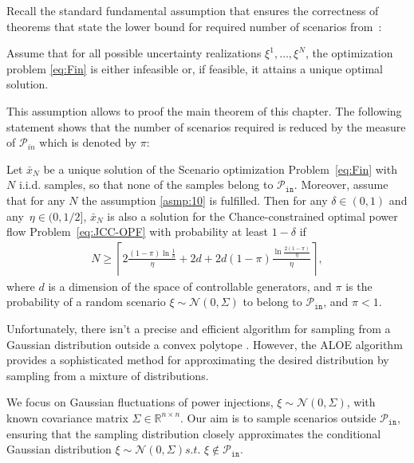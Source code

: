Recall the standard fundamental assumption that ensures the correctness of theorems that state the lower bound for required number of scenarios from~\cite{calafiore2006scenario}:
\begin{assumption}\label{asmp:10}
Assume that for all possible uncertainty realizations $\xi^1, \dots, \xi^N$, the optimization problem \eqref{eq:Fin} is either infeasible or, if feasible, it attains a unique optimal solution.
\end{assumption}

This assumption allows to proof the main theorem of this chapter. The following statement shows that the number of scenarios required is reduced by the measure of $\mathcal{P}_{in}$ which is denoted by $\pi$:
\begin{theorem}\label{thm:40}
Let $\bar x_N$ be a unique solution of the Scenario optimization Problem~\eqref{eq:Fin} with $N$ i.i.d. samples, so that none of the samples belong to $\mathcal{P}_{\texttt{in}}$. Moreover, assume that for any $N$ the assumption \ref{asmp:10} is fulfilled. Then for any $\delta \in (0,1)$ and any~$\eta \in (0, 1/2]$, $\bar x_N$ is also a solution for the Chance-constrained optimal power flow Problem~\eqref{eq:JCC-OPF} with probability at least $1-\delta$ if 
\begin{align*}
  N \ge \left\lceil 2\frac{(1-\pi)\ln \frac{1}{\delta}}{\eta} + 2d + 2d (1-\pi) \frac{\ln\frac{2(1-\pi)}{\eta}}{\eta} \right\rceil, 
\end{align*} 
where $d$ is a dimension of the space of controllable generators, and $\pi$ is the probability of a random scenario $\xi\sim \mathcal{N}(0, \Sigma)$ to belong to $\mathcal{P}_{\texttt{in}}$, and $\pi < 1$. 
\end{theorem}

Unfortunately, there isn't a precise and efficient algorithm for sampling from a Gaussian distribution outside a convex polytope \cite{khachiyan1993complexity}. However, the ALOE algorithm \cite{owen2019importance, lukashevich2021power} provides a sophisticated method for approximating the desired distribution by sampling from a mixture of distributions.

We focus on Gaussian fluctuations of power injections, $\xi \sim \mathcal{N}(0, \Sigma)$, with known covariance matrix $\Sigma \in \mathbb{R}^{n \times n}$. Our aim is to sample scenarios outside $\mathcal{P}_{\texttt{in}}$, ensuring that the sampling distribution closely approximates the conditional Gaussian distribution $\xi \sim \mathcal{N}(0, \Sigma) \textit{s.t. } \xi \not\in \mathcal{P}_{\texttt{in}}$.

